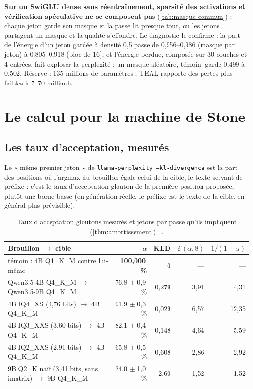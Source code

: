 \textbf{Sur un SwiGLU dense sans réentraînement, sparsité des activations et vérification spéculative ne se composent pas} (\cref{tab:masque-commun}) : chaque jeton garde son masque et la passe lit presque tout, ou les jetons partagent un masque et la qualité s'effondre. Le diagnostic le confirme : la part de l'énergie d'un jeton gardée à densité 0,5 passe de 0,956--0,986 (masque par jeton) à 0,805--0,918 (bloc de 16), et l'énergie perdue, composée sur 30 couches et 4 entrées, fait exploser la perplexité ; un masque aléatoire, témoin, garde 0,499 à 0,502. Réserve : 135 millions de paramètres ; TEAL rapporte des pertes plus faibles à 7--70 milliards.

\section{Le calcul pour la machine de Stone}\label{sec:spec-machine}

\subsection{Les taux d'acceptation, mesurés}\label{sec:alpha}

Le « même premier jeton » de \texttt{llama-perplexity --kl-divergence} est la part des positions où l'argmax du brouillon égale celui de la cible, le texte servant de préfixe : c'est le taux d'acceptation glouton de la première position proposée, plutôt une borne basse (en génération réelle, le préfixe est le texte de la cible, en général plus prévisible).

\begin{table}[ht]
\centering\small
\caption[Taux d'acceptation gloutons mesurés]{Taux d'acceptation gloutons mesurés et jetons par passe qu'ils impliquent (\cref{thm:amortissement}) \mes~\calc.}
\label{tab:alpha}
\begin{tabular}{@{}lrrrr@{}}
\toprule
Brouillon $\to$ cible & $\alpha$ & KLD & $\mathcal E(\alpha,8)$ & $1/(1-\alpha)$ \\
\midrule
témoin : 4B Q4\_K\_M contre lui-même & \textbf{100,000\,\%} & 0 & --- & --- \\
Qwen3.5-4B Q4\_K\_M $\to$ Qwen3.5-9B Q4\_K\_M & 76,8 $\pm$ 0,9\,\% & 0,279 & 3,91 & 4,31 \\
4B IQ4\_XS (4,76 bits) $\to$ 4B Q4\_K\_M & 91,9 $\pm$ 0,3\,\% & 0,029 & 6,57 & 12,35 \\
4B IQ3\_XXS (3,60 bits) $\to$ 4B Q4\_K\_M & 82,1 $\pm$ 0,4\,\% & 0,148 & 4,64 & 5,59 \\
4B IQ2\_XXS (2,91 bits) $\to$ 4B Q4\_K\_M & 65,8 $\pm$ 0,5\,\% & 0,608 & 2,86 & 2,92 \\
9B Q2\_K naïf (3,41 bits, sans imatrix) $\to$ 9B Q4\_K\_M & 34,0 $\pm$ 1,0\,\% & 2,60 & 1,52 & 1,52 \\
\bottomrule
\end{tabular}
\end{table}

